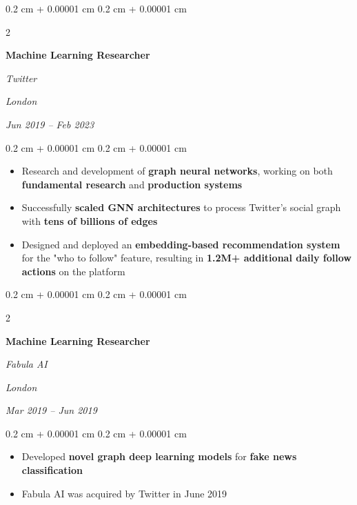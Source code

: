 \documentclass[10pt, letterpaper]{article}
\newenvironment{highlights}{
    \begin{itemize}[
        topsep=0.10 cm,
        parsep=0.10 cm,
        partopsep=0pt,
        itemsep=0pt,
        leftmargin=0.4 cm + 10pt
    ]
}{
    \end{itemize}
} %
\newenvironment{onecolentry}{
    \begin{adjustwidth}{
        0.2 cm + 0.00001 cm
    }{
        0.2 cm + 0.00001 cm
    }
}{
    \end{adjustwidth}
} %
\newenvironment{twocolentry}[2][]{
    \onecolentry
    \def\secondColumn{#2}
    \setcolumnwidth{\fill, 4.5 cm}
    \begin{paracol}{2}
}{
    \switchcolumn \raggedleft \secondColumn
    \end{paracol}
    \endonecolentry
} %
\begin{document}
    \vspace{0.2 cm}

    \begin{twocolentry}{
    \textit{London}
        
    \textit{Jun 2019 – Feb 2023}}
        \textbf{Machine Learning Researcher}
        
        \textit{Twitter}
    \end{twocolentry}

    \vspace{0.10 cm}
    \begin{onecolentry}
        \begin{highlights}
            \item Research and development of \textbf{graph neural networks}, working on both \textbf{fundamental research} and \textbf{production systems}
            \item Successfully \textbf{scaled GNN architectures} to process Twitter's social graph with \textbf{tens of billions of edges}
            \item Designed and deployed an \textbf{embedding-based recommendation system} for the "who to follow" feature, resulting in \textbf{1.2M+ additional daily follow actions} on the platform
        \end{highlights}
    \end{onecolentry}

    \vspace{0.2 cm}

    \begin{twocolentry}{
    \textit{London}
        
    \textit{Mar 2019 – Jun 2019}}
        \textbf{Machine Learning Researcher}
        
        \textit{Fabula AI}
    \end{twocolentry}

    \vspace{0.10 cm}
    \begin{onecolentry}
        \begin{highlights}
            \item Developed \textbf{novel graph deep learning models} for \textbf{fake news classification}
            \item Fabula AI was acquired by Twitter in June 2019
        \end{highlights}
    \end{onecolentry}

    \vspace{0.2 cm}
\end{document}
